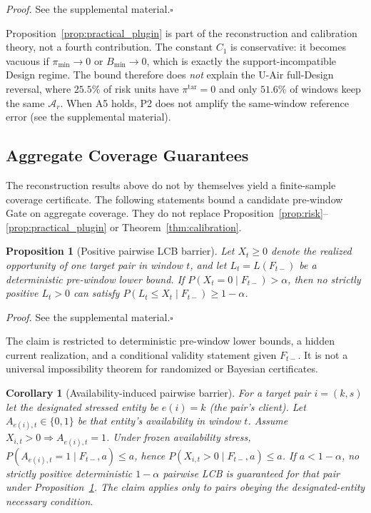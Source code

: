 \documentclass[letterpaper,journal]{IEEEtran}
\newtheorem{proposition}{Proposition}
\newtheorem{corollary}{Corollary}
\begin{document}
\noindent\emph{Proof.}
See the supplemental material.\hfill$\square$

Proposition~\ref{prop:practical_plugin} is part of the reconstruction
and calibration theory, not a fourth contribution.  The constant
$C_1$ is conservative: it becomes vacuous if $\pi_{\min}\to0$ or
$B_{\min}\to0$, which is exactly the support-incompatible Design regime.
The bound therefore does \emph{not} explain the U-Air full-Design
reversal, where $25.5\%$ of risk units have $\pi^{\mathrm{tar}}=0$ and
only $51.6\%$ of windows keep the same $\mathcal{A}_r$.  When A5 holds,
P2 does not amplify the same-window reference error
(see the supplemental material).

\subsection{Aggregate Coverage Guarantees}
\label{subsec:agg_coverage_theory}

The reconstruction results above do not by themselves yield a finite-sample
coverage certificate.  The following statements bound a candidate
pre-window Gate on aggregate coverage.  They do not replace
Proposition~\ref{prop:risk}--\ref{prop:practical_plugin}
or Theorem~\ref{thm:calibration}.

\begin{proposition}[Positive pairwise LCB barrier]
\label{prop:pairwise-lcb-barrier}
Let $X_t\ge 0$ denote the realized opportunity of one target pair in window
$t$, and let $L_t=L(F_{t-})$ be a deterministic pre-window lower bound.  If
$P(X_t=0\mid F_{t-})>\alpha$, then no strictly positive $L_t>0$ can satisfy
$P(L_t\le X_t\mid F_{t-})\ge 1-\alpha$.
\end{proposition}

\noindent\emph{Proof.}
See the supplemental material.\hfill$\square$

The claim is restricted to deterministic pre-window lower bounds, a hidden
current realization, and a conditional validity statement given $F_{t-}$.  It
is not a universal impossibility theorem for randomized or Bayesian
certificates.

\begin{corollary}[Availability-induced pairwise barrier]
\label{cor:availability-barrier}
For a target pair $i=(k,s)$ let the designated stressed entity be $e(i)=k$
(the pair's client).  Let $A_{e(i),t}\in\{0,1\}$ be that entity's availability
in window $t$.  Assume $X_{i,t}>0\Rightarrow A_{e(i),t}=1$.  Under frozen
availability stress, $P(A_{e(i),t}=1\mid F_{t-},a)\le a$, hence
$P(X_{i,t}>0\mid F_{t-},a)\le a$.  If $a<1-\alpha$, no strictly positive
deterministic $1-\alpha$ pairwise LCB is guaranteed for that pair under
Proposition~\ref{prop:pairwise-lcb-barrier}.  The claim applies only to pairs
obeying the designated-entity necessary condition.
\end{corollary}
\end{document}
